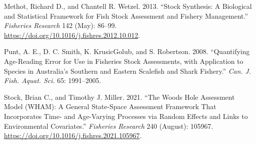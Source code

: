 \documentclass[
  letterpaper,
  DIV=11,
  numbers=noendperiod]{scrreprt}
\newlength{\cslhangindent}
\newenvironment{CSLReferences}[2] %
 {\begin{list}{}{%
  \setlength{\itemindent}{0pt}
  \setlength{\leftmargin}{0pt}
  \setlength{\parsep}{0pt}
  \ifodd #1
   \setlength{\leftmargin}{\cslhangindent}
   \setlength{\itemindent}{-1\cslhangindent}
  \fi
  \setlength{\itemsep}{#2\baselineskip}}}
 {\end{list}}
\begin{document}
\begin{CSLReferences}{1}{0}
Methot, Richard D., and Chantell R. Wetzel. 2013. {``Stock Synthesis: A
Biological and Statistical Framework for Fish Stock Assessment and
Fishery Management.''} \emph{Fisheries Research} 142 (May): 86--99.
\url{https://doi.org/10.1016/j.fishres.2012.10.012}.

Punt, A. E., D. C. Smith, K. KrusicGolub, and S. Robertson. 2008.
{``Quantifying Age-Reading Error for Use in Fisheries Stock Assessments,
with Application to Species in Australia's Southern and Eastern
Scalefish and Shark Fishery.''} \emph{Can. J. Fish. Aquat. Sci.} 65:
1991--2005.

Stock, Brian C., and Timothy J. Miller. 2021. {``The {Woods Hole
Assessment Model} ({WHAM}): {A} General State-Space Assessment Framework
That Incorporates Time- and Age-Varying Processes via Random Effects and
Links to Environmental Covariates.''} \emph{Fisheries Research} 240
(August): 105967. \url{https://doi.org/10.1016/j.fishres.2021.105967}.

\end{CSLReferences}
\end{document}
